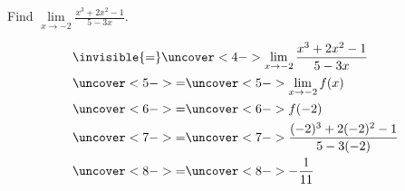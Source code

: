 \begin{frame}
\begin{example} %
Find $\lim\limits_{x\rightarrow -2}\frac{x^3+2x^2-1}{5-3x}$.

\begin{align*}
& \invisible{=} \uncover<4->{\lim\limits_{x\rightarrow -2} \frac{x^3 + 2x^2 - 1}{5-3x}}\\
& \uncover<5->{ = }  
\uncover<5->{\lim\limits_{x\rightarrow -2}f(x)}\\
& \uncover<6->{ = }  
\uncover<6->{f(-2)}\\
& \uncover<7->{ = }  
\uncover<7->{\frac{(-2)^3 + 2(-2)^2 - 1}{5 - 3(-2)}}\\
& \uncover<8->{ = }  
\uncover<8->{-\frac{1}{11}}
\end{align*}
\end{example}
\end{frame}
